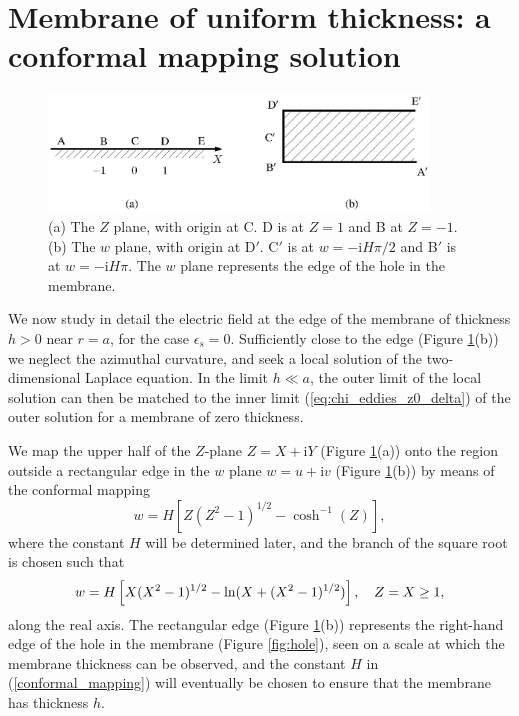 \section{Membrane of uniform thickness: a conformal mapping solution
\label{sec:conformal_map}}

\begin{figure}[h]
\begin{center}
\includegraphics[width=0.9\textwidth,clip=true]{eddies/eddy_fig2a.eps}
\caption{(a) The $Z$ plane, with origin at C. D is at $Z=1$ and B at $Z=-1$.
(b) The $w$ plane, with origin at D$'$. C$'$ is at $w=-\text{i}H\pi/2$
and B$'$ is at $w=-\text{i}H\pi$. The $w$ plane represents the edge of the hole
in the membrane. \label{fig:z_plane}}
\end{center}
\end{figure}

We now study in detail the electric field
at the edge of the membrane of thickness $h>0$ near $r=a$,
for the case $\epsilon_s=0$. Sufficiently close
to the edge (Figure \ref{fig:z_plane}(b)) we neglect the azimuthal curvature,
and seek a local solution of the two-dimensional Laplace equation.
In the limit $h\ll a$, the outer limit of the
local solution can then be matched
to the inner limit
(\ref{eq:chi_eddies_z0_delta}) of the outer solution
for a membrane of zero thickness.

We map the upper half
of the $Z$-plane $Z=X+\text{i}Y$ (Figure \ref{fig:z_plane}(a)) onto the region outside a
rectangular edge in the $w$ plane $w=u+\text{i}v$ (Figure \ref{fig:z_plane}(b))
by means of the conformal mapping \cite{driscoll2002}
\begin{equation}
w=H\left\lbrack Z(Z^2-1)^{1/2}-\cosh^{-1}(Z)\right\rbrack,
\label{conformal_mapping}
\end{equation}
where the constant $H$ will be determined later, and
the branch of the square root is chosen such that
\begin{equation}
w=H\left\lbrack X(X^2-1)^{1/2}-\ln(X+(X^2-1)^{1/2})\right\rbrack,
\hskip 10pt Z=X\ge 1,
\end{equation}
along the real axis.
The rectangular edge (Figure \ref{fig:z_plane}(b)) represents the right-hand edge of the 
hole in the membrane (Figure \ref{fig:hole}), seen on a scale at which the membrane thickness
can be observed, and
the constant $H$ in (\ref{conformal_mapping}) will eventually be chosen
to ensure that the membrane has thickness $h$.

